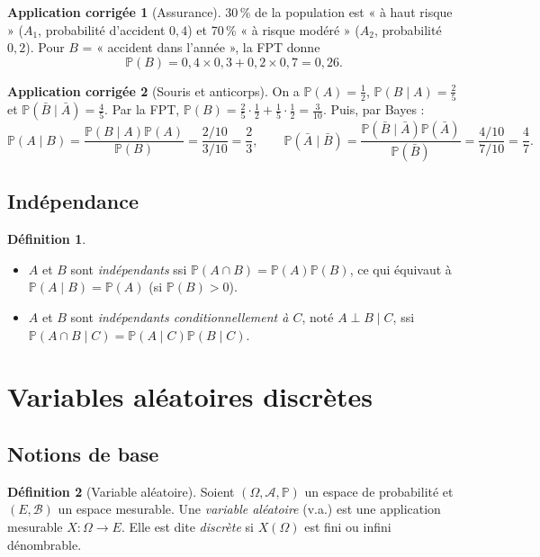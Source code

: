 \documentclass[11pt,a4paper]{article}
\renewcommand{\P}{\mathbb{P}}
\newcommand{\A}{\mathcal{A}}
\newcommand{\1}{\mathbf{1}}
\theoremstyle{definition}
\newtheorem*{definition}{Définition}
\newtheorem*{application}{Application corrigée}
\theoremstyle{plain}
\theoremstyle{remark}
\begin{document}
\begin{application}[Assurance]
30\,\% de la population est « à haut risque » ($A_1$, probabilité d'accident $0{,}4$) et 70\,\% « à risque modéré » ($A_2$, probabilité $0{,}2$). Pour $B$ = « accident dans l'année », la FPT donne
\[
\P(B)=0{,}4\times0{,}3+0{,}2\times0{,}7=0{,}26.
\]
\end{application}

\begin{application}[Souris et anticorps]
On a $\P(A)=\tfrac12$, $\P(B\mid A)=\tfrac25$ et $\P(\bar B\mid\bar A)=\tfrac45$. Par la FPT,
$\P(B)=\tfrac25\cdot\tfrac12+\tfrac15\cdot\tfrac12=\tfrac{3}{10}$. Puis, par Bayes :
\[
\P(A\mid B)=\frac{\P(B\mid A)\P(A)}{\P(B)}=\frac{2/10}{3/10}=\frac23,
\qquad
\P(\bar A\mid\bar B)=\frac{\P(\bar B\mid\bar A)\P(\bar A)}{\P(\bar B)}=\frac{4/10}{7/10}=\frac47.
\]
\end{application}

\subsection{Indépendance}

\begin{definition}
\begin{itemize}
  \item $A$ et $B$ sont \emph{indépendants} ssi $\P(A\cap B)=\P(A)\P(B)$, ce qui équivaut à $\P(A\mid B)=\P(A)$ (si $\P(B)>0$).
  \item $A$ et $B$ sont \emph{indépendants conditionnellement à $C$}, noté $A\perp B\mid C$, ssi $\P(A\cap B\mid C)=\P(A\mid C)\P(B\mid C)$.
\end{itemize}
\end{definition}

\section{Variables aléatoires discrètes}

\subsection{Notions de base}

\begin{definition}[Variable aléatoire]
Soient $(\Omega,\A,\P)$ un espace de probabilité et $(E,\mathcal{B})$ un espace mesurable. Une \emph{variable aléatoire} (v.a.) est une application mesurable $X:\Omega\to E$. Elle est dite \emph{discrète} si $X(\Omega)$ est fini ou infini dénombrable.
\end{definition}
\end{document}
